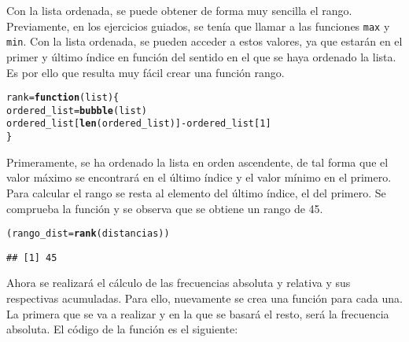 \documentclass[12pt]{report}\usepackage[]{graphicx}\usepackage[dvipsnames]{xcolor}
\makeatletter
\newcommand{\hlnum}[1]{\textcolor[rgb]{0.686,0.059,0.569}{#1}}%
\newcommand{\hlopt}[1]{\textcolor[rgb]{0,0,0}{#1}}%
\newcommand{\hlstd}[1]{\textcolor[rgb]{0.345,0.345,0.345}{#1}}%
\newcommand{\hlkwa}[1]{\textcolor[rgb]{0.161,0.373,0.58}{\textbf{#1}}}%
\newcommand{\hlkwb}[1]{\textcolor[rgb]{0.69,0.353,0.396}{#1}}%
\newcommand{\hlkwc}[1]{\textcolor[rgb]{0.333,0.667,0.333}{#1}}%
\newcommand{\hlkwd}[1]{\textcolor[rgb]{0.737,0.353,0.396}{\textbf{#1}}}%
\newenvironment{kframe}{%
 \def\at@end@of@kframe{}%
 \ifinner\ifhmode%
  \def\at@end@of@kframe{\end{minipage}}%
  \begin{minipage}{\columnwidth}%
 \fi\fi%
 \def\FrameCommand##1{\hskip\@totalleftmargin \hskip-\fboxsep
 \colorbox{shadecolor}{##1}\hskip-\fboxsep
     \hskip-\linewidth \hskip-\@totalleftmargin \hskip\columnwidth}%
 \MakeFramed {\advance\hsize-\width
   \@totalleftmargin\z@ \linewidth\hsize
   \@setminipage}}%
 {\par\unskip\endMakeFramed%
 \at@end@of@kframe}
\newenvironment{knitrout}{}{} %
\makeatother
\begin{document}
			Con la lista ordenada, se puede obtener de forma muy sencilla el rango. Previamente, en los ejercicios guiados, se tenía que llamar a las funciones \texttt{max} y \texttt{min}. Con la lista ordenada, se pueden acceder a estos valores, ya que estarán en el primer y último índice en función del sentido en el que se haya ordenado la lista. Es por ello que resulta muy fácil crear una función rango.
			
\begin{knitrout}
\color{fgcolor}\begin{kframe}
\begin{alltt}
\hlstd{rank} \hlkwb{=} \hlkwa{function}\hlstd{(}\hlkwc{list}\hlstd{) \{}
        \hlstd{ordered_list} \hlkwb{=} \hlkwd{bubble}\hlstd{(list)}
        \hlstd{ordered_list[}\hlkwd{len}\hlstd{(ordered_list)]} \hlopt{-} \hlstd{ordered_list[}\hlnum{1}\hlstd{]}
\hlstd{\}}
\end{alltt}
\end{kframe}
\end{knitrout}
			
			Primeramente, se ha ordenado la lista en orden ascendente, de tal forma que el valor máximo se encontrará en el último índice y el valor mínimo en el primero. Para calcular el rango se resta al elemento del último índice, el del primero. Se comprueba la función y se observa que se obtiene un rango de 45.
			
\begin{knitrout}
\color{fgcolor}\begin{kframe}
\begin{alltt}
\hlstd{(rango_dist} \hlkwb{=} \hlkwd{rank}\hlstd{(distancias))}
\end{alltt}
\begin{verbatim}
## [1] 45
\end{verbatim}
\end{kframe}
\end{knitrout}
			
			Ahora se realizará el cálculo de las frecuencias absoluta y relativa y sus respectivas acumuladas. Para ello, nuevamente se crea una función para cada una. La primera que se va a realizar y en la que se basará el resto, será la frecuencia absoluta. El código de la función es el siguiente:
			
\end{document}
